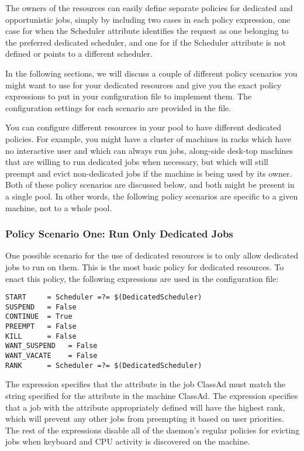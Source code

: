 The owners of the resources can easily define separate policies for
dedicated and opportunistic jobs, simply by including two cases in
each policy expression, one case for when the Scheduler attribute
identifies the request as one belonging to the preferred dedicated
scheduler, and one for if the Scheduler attribute is not defined or
points to a different scheduler.

In the following sections, we will discuss a couple of different
policy scenarios you might want to use for your dedicated resources
and give you the exact policy expressions to put in your configuration
file to implement them.
The configuration settings for each scenario are provided in the
 file.

\Note You can configure different resources in your pool to have
different dedicated policies.
For example, you might have a cluster of machines in racks which have
no interactive user and which can always run jobs, along-side desk-top
machines that are willing to run dedicated jobs when necessary, but
which will still preempt and evict non-dedicated jobs if the machine
is being used by its owner.  
Both of these policy scenarios are discussed below, and both might be
present in a single pool.
In other words, the following policy scenarios are specific to a given
machine, not to a whole pool.


\subsubsection{\label{sec:Configure-Dedicated-Only-Policy}
Policy Scenario One: Run Only Dedicated Jobs}

One possible scenario for the use of dedicated resources
is to only allow dedicated jobs to run on them.  
This is the most basic policy for dedicated resources.
To enact this policy, the following expressions are used in
the configuration file:

\begin{verbatim}
START     = Scheduler =?= $(DedicatedScheduler)
SUSPEND   = False
CONTINUE  = True
PREEMPT   = False
KILL      = False
WANT_SUSPEND   = False
WANT_VACATE    = False
RANK      = Scheduler =?= $(DedicatedScheduler)
\end{verbatim}

The  expression specifies that the 
attribute in the job ClassAd must match the string specified for
the  attribute in the machine ClassAd.
The  expression specifies that a job with the
 attribute appropriately defined will have the highest
rank, which will prevent any other jobs from preempting it based on
user priorities.
The rest of the expressions disable all of the  daemon's
regular policies for evicting jobs when keyboard and CPU activity is
discovered on the machine.


